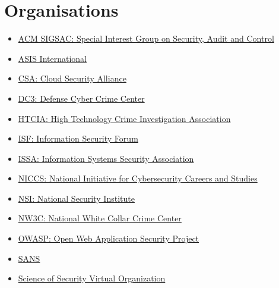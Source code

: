 \documentclass[a4paper, 12pt, titlepage]{report}
\begin{document}
\section{Organisations}
\begin{multicols}{2}
\begin{itemize}
\item \href{http://www.sigsac.org/}{ACM SIGSAC: Special Interest Group on Security, Audit and Control}
\item \href{https://www.asisonline.org/}{ASIS International}
\item \href{https://cloudsecurityalliance.org/}{CSA: Cloud Security Alliance}
\item \href{https://www.dc3.mil/}{DC3: Defense Cyber Crime Center}
\item \href{https://htcia.org/}{HTCIA: High Technology Crime Investigation Association}
\item \href{https://www.securityforum.org/}{ISF: Information Security Forum}
\item \href{https://www.issa.org/default.aspx}{ISSA: Information Systems Security Association}
\item \href{https://niccs.us-cert.gov/}{NICCS: National Initiative for Cybersecurity Careers and Studies}
\item \href{https://www.nsi.org/}{NSI: National Security Institute}
\item \href{https://www.nw3c.org/}{NW3C: National White Collar Crime Center}
\item \href{https://www.owasp.org/index.php/Main_Page}{OWASP: Open Web Application Security Project}
\item \href{https://www.sans.org/}{SANS}
\item \href{https://cps-vo.org/group/SoS}{Science of Security Virtual Organization}
\end{itemize}
\end{multicols}
\end{document}
